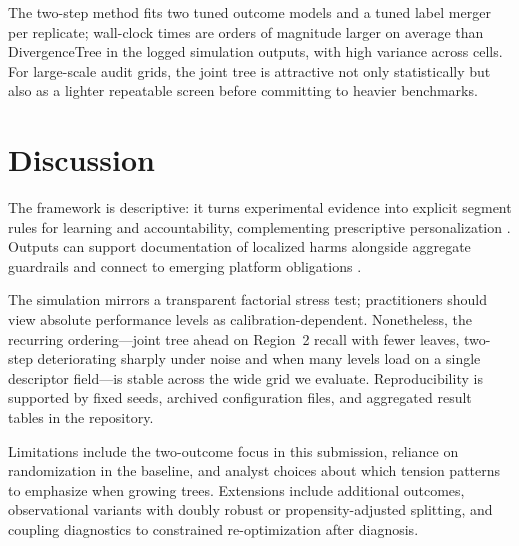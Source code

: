 \documentclass[12pt,a4paper]{article}
\begin{document}
The two-step method fits two tuned outcome models and a tuned label merger per replicate; wall-clock times are orders of magnitude larger on average than DivergenceTree in the logged simulation outputs, with high variance across cells. For large-scale audit grids, the joint tree is attractive not only statistically but also as a lighter repeatable screen before committing to heavier benchmarks.

\section{Discussion}
\label{sec:discussion}

The framework is descriptive: it turns experimental evidence into explicit segment rules for learning and accountability, complementing prescriptive personalization \citep{rafieian2025multiobjective}. Outputs can support documentation of localized harms alongside aggregate guardrails and connect to emerging platform obligations \citep{dsa2022article34}.

The simulation mirrors a transparent factorial stress test; practitioners should view absolute performance levels as calibration-dependent. Nonetheless, the recurring ordering---joint tree ahead on Region~2 recall with fewer leaves, two-step deteriorating sharply under noise and when many levels load on a single descriptor field---is stable across the wide grid we evaluate. Reproducibility is supported by fixed seeds, archived configuration files, and aggregated result tables in the repository.

Limitations include the two-outcome focus in this submission, reliance on randomization in the baseline, and analyst choices about which tension patterns to emphasize when growing trees. Extensions include additional outcomes, observational variants with doubly robust or propensity-adjusted splitting, and coupling diagnostics to constrained re-optimization after diagnosis.



\end{document}

